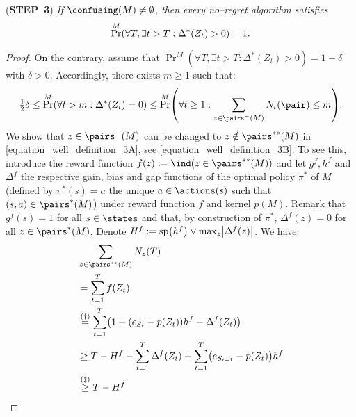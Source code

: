 \documentclass[preprint,cleveref,12pt]{colt2025}
\DeclarePairedDelimiter{\parens}{(}{)}	%
\DeclarePairedDelimiter{\abs}{\lvert}{\rvert}	%
\newcommand{\indic}[1]{\ind\parens{#1}}
\def\indicator{\indic}
\def\STEP#1{(\strong{STEP~#1})}
\newcommand{\strong}[1]{\textbf{#1}}
\begin{document}
    \noindent
    \STEP{3}
    \textit{
        If $\confusing(M) \ne \emptyset$, then every no--regret algorithm satisfies
        \begin{equation}
        \label{equation_well_definition_3_0}
            \Pr^M \parens*{
                \forall T, \exists t > T: \Delta^*(Z_t) > 0
            }
            = 
            1.
        \end{equation}
    }
    \begin{proof}
        On the contrary, assume that $\Pr^M( \forall T, \exists t > T: \Delta^*(Z_t) > 0) = 1 - \delta$ with $\delta > 0$.
        Accordingly, there exists $m \ge 1$ such that:
        \begin{equation}
        \label{equation_well_definition_3A}
            \tfrac 12 \delta 
            \le 
            \Pr^M \parens*{
                \forall t > m: \Delta^*(Z_t) = 0
            } 
            \le
            \Pr^M \parens*{
                \forall t \ge 1:
                \sum_{z \in \pairs^-(M)} N_t(\pair) \le m
            }
            .
        \end{equation}
        We show that $z \in \pairs^-(M)$ can be changed to $z \notin \pairs^{**}(M)$ in \eqref{equation_well_definition_3A}, see \eqref{equation_well_definition_3B}. 
        To see this, introduce the reward function $f(z) := \indicator{z \in \pairs^{**}(M)}$ and let $g^f, h^f$ and $\Delta^f$ the respective gain, bias and gap functions of the optimal policy $\pi^*$ of $M$ (defined by $\pi^*(s) = a$ the unique $a \in \actions(s)$ such that $(s,a) \in \pairs^{*}(M)$) under reward function $f$ and kernel $p(M)$.
        Remark that $g^f(s) = 1$ for all $s \in \states$ and that, by construction of $\pi^*$, $\Delta^f(z) = 0$ for all $z \in \pairs^{*}(M)$.
        Denote $H^f := \mathrm{sp}\parens*{h^f} \vee \max_z \abs*{\Delta^f(z)}$.
        We have:
        \begin{align*}
            & \sum_{z \in \pairs^{**}(M)}
            N_z(T)
            \\
            & = \sum_{t=1}^T f(Z_t)
            \\
            & \overset{(\dagger)}= 
            \sum_{t=1}^T \parens*{1 + \parens*{e_{S_t} - p(Z_t)}h^f - \Delta^f(Z_t)}
            \\
            & \ge 
            T - H^f
            - \sum_{t=1}^T \Delta^f(Z_t)
            + \sum_{t=1}^T \parens*{e_{S_{t+1}} - p(Z_t)} h^f
            \\
            & \overset{(\ddagger)}\ge 
            T - H^f

\end{align*}
\end{proof}
\end{document}
